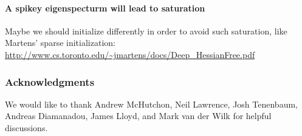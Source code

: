 \documentclass{article}
\begin{document}
\paragraph{A spikey eigenspecturm will lead to saturation}
Maybe we should initialize differently in order to avoid such saturation, like Martens' sparse initialization: \url{http://www.cs.toronto.edu/~jmartens/docs/Deep_HessianFree.pdf}




\subsubsection*{Acknowledgments}

We would like to thank Andrew McHutchon, Neil Lawrence, Josh Tenenbaum, Andreas Diamanadou, James Lloyd, and Mark van der Wilk for helpful discussions.



\end{document}

